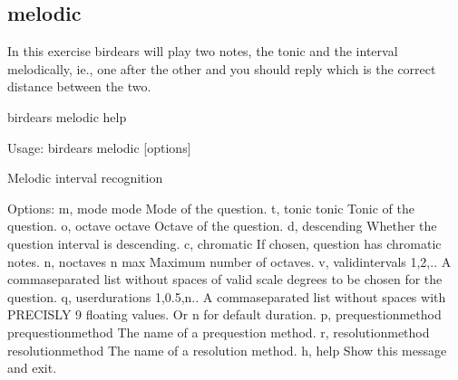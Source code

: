 \documentclass[letterpaper,10pt,english]{sphinxmanual}
\begin{document}
\subsection{melodic}
\label{\detokenize{index:melodic}}
In this exercise birdears will play two notes, the tonic and the interval
melodically, ie., one after the other and you should reply which is the
correct distance between the two.

\begin{sphinxVerbatim}[commandchars=\\\{\}]
birdears melodic \PYGZhy{}\PYGZhy{}help
\end{sphinxVerbatim}

\begin{sphinxVerbatim}[commandchars=\\\{\}]
Usage: birdears melodic [options]

  Melodic interval recognition

Options:
  \PYGZhy{}m, \PYGZhy{}\PYGZhy{}mode \PYGZlt{}mode\PYGZgt{}               Mode of the question.
  \PYGZhy{}t, \PYGZhy{}\PYGZhy{}tonic \PYGZlt{}tonic\PYGZgt{}             Tonic of the question.
  \PYGZhy{}o, \PYGZhy{}\PYGZhy{}octave \PYGZlt{}octave\PYGZgt{}           Octave of the question.
  \PYGZhy{}d, \PYGZhy{}\PYGZhy{}descending                Whether the question interval is descending.
  \PYGZhy{}c, \PYGZhy{}\PYGZhy{}chromatic                 If chosen, question has chromatic notes.
  \PYGZhy{}n, \PYGZhy{}\PYGZhy{}n\PYGZus{}octaves \PYGZlt{}n max\PYGZgt{}         Maximum number of octaves.
  \PYGZhy{}v, \PYGZhy{}\PYGZhy{}valid\PYGZus{}intervals \PYGZlt{}1,2,..\PYGZgt{}  A comma\PYGZhy{}separated list without spaces
                                  of valid scale degrees to be chosen for the
                                  question.
  \PYGZhy{}q, \PYGZhy{}\PYGZhy{}user\PYGZus{}durations \PYGZlt{}1,0.5,n..\PYGZgt{}
                                  A comma\PYGZhy{}separated list without
                                  spaces with PRECISLY 9 floating values. Or
                                  \PYGZsq{}n\PYGZsq{} for default              duration.
  \PYGZhy{}p, \PYGZhy{}\PYGZhy{}prequestion\PYGZus{}method \PYGZlt{}prequestion\PYGZus{}method\PYGZgt{}
                                  The name of a pre\PYGZhy{}question method.
  \PYGZhy{}r, \PYGZhy{}\PYGZhy{}resolution\PYGZus{}method \PYGZlt{}resolution\PYGZus{}method\PYGZgt{}
                                  The name of a resolution method.
  \PYGZhy{}h, \PYGZhy{}\PYGZhy{}help                      Show this message and exit.


\end{sphinxVerbatim}
\end{document}
